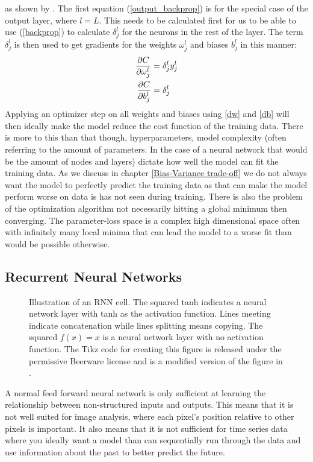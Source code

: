 as shown by \citet{fysstkweek40}.
The first equation (\ref{output_backprop}) is for the special case of the output 
layer, where $l=L$. This needs to be calculated first for us to be able to use 
(\ref{backprop}) to calculate $\delta^l_j$ for the neurons in the rest of the layer. 
The term $\delta^l_j$ is then used to get gradients for the weights $\omega^l_j$ 
and biases $b^l_j$ in this manner:
\begin{align}
    \pdv{C}{\omega^l_j} &= \delta^l_j y^l_j \label{dw}\\
    \pdv{C}{b^l_j} &= \delta^l_j \label{db}
\end{align}
Applying an optimizer step on all weights and biases using \ref{dw} and \ref{db}
will then ideally make the model reduce the cost function of the training data.
There is more to this than that though, hyperparameters, model complexity (often 
referring to the amount of parameters. In the case of a neural network that would 
be the amount of nodes and layers) dictate how well the model can fit the training 
data. As we discuss in chapter \ref{Bias-Variance trade-off} we do not always want 
the model to perfectly predict the training data as that can make the model perform 
worse on data is has not seen during training. There is also the problem of the 
optimization algorithm not necessarily hitting a global minimum then converging. 
The parameter-loss space is a complex high dimensional space often with infinitely 
many local minima that can lead the model to a worse fit than would be possible 
otherwise. \citationneeded
\subsection{Recurrent Neural Networks}
\label{RNN Theory}
\begin{figure}
    
    \caption[An RNN cell.]{Illustration of an RNN cell. The squared tanh indicates a neural 
    network layer with tanh as the activation function. Lines meeting indicate 
    concatenation while lines splitting means copying. 
	The squared $f(x)=x$ is a neural network layer with no activation function.
The Tikz code for creating this figure is released under the permissive Beerware license 
    and is a modified version of the figure in \citet{tikzlstm}.}
	\label{RNN figure}
\end{figure}
A normal feed forward neural network is only sufficient at learning the relationship 
between non-structured inputs and outputs. This means that it is not well suited 
for image analysis, where each pixel's position relative to other pixels is important. 
It also means that it is not sufficient for time series data where you ideally 
want a model than can sequentially run through the data and use information about 
the past to better predict the future.

